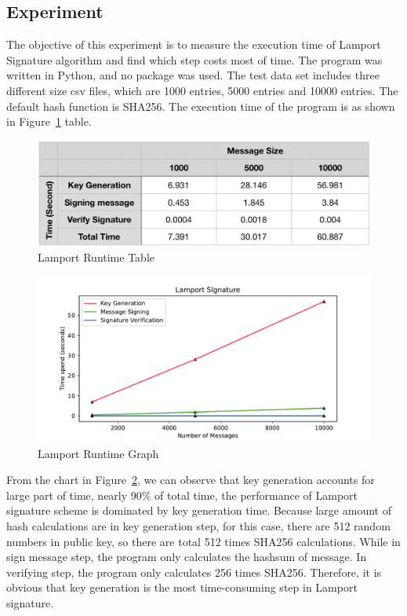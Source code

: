 \documentclass[10pt,sigconf]{acmart}
\begin{document}
\subsection{Experiment}

The objective of this experiment is to measure the execution time of Lamport Signature algorithm and find which step costs most of time. The program was written in Python, and no package was used. The test data set includes three different size csv files, which are 1000 entries, 5000 entries and 10000 entries. The default hash function is SHA256. The execution time of the program is as shown in Figure~\ref{fig:Lamport_Runtime_Table} table.

\begin{figure}[H]
\centering
\includegraphics[scale=0.4]{Lamport_Runtime_Table.png}
\caption{\small{Lamport Runtime Table}}
\label{fig:Lamport_Runtime_Table}
\end{figure}

\begin{figure}[H]
\centering
\includegraphics[scale=0.45]{Lamport_Runtime_Graph}
\caption{\small{Lamport Runtime Graph}}
\label{fig:Lamport_Runtime_Graph}
\end{figure}

From the chart in Figure~\ref{fig:Lamport_Runtime_Graph}, we can observe that  key generation accounts for large part of time, nearly 90\% of total time, the performance of Lamport signature scheme is dominated by key generation time. Because large amount of hash calculations are in key generation step, for this case, there are 512 random numbers in public key, so there are total 512 times SHA256 calculations. While in sign message step, the program only calculates the hashsum of message. In verifying step, the program only calculates 256 times SHA256. Therefore, it is obvious that key generation is the most time-consuming step in Lamport signature.
\end{document}
